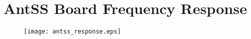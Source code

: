 \chapter{AntSS Board Frequency Response}
\begin{figure}[!ht]
\centering
\texttt{[image: antss\_response.eps]}
\end{figure}


